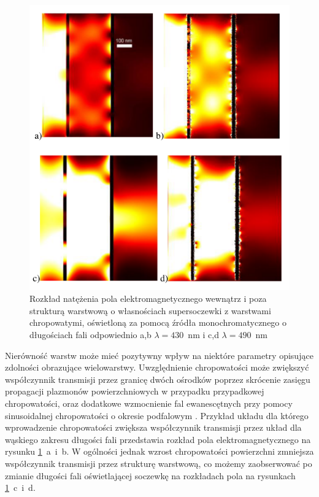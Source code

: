 \begin{figure}[!hbt]
	\begin{center}
	\includegraphics[width=.9\textwidth]{images/multilayer/plp-chropo.png}
	\end{center}
	\caption{Rozkład natężenia pola elektromagnetycznego wewnątrz i poza strukturą warstwową o własnościach supersoczewki z warstwami chropowatymi, oświetloną za pomocą źródła monochromatycznego o długościach fali odpowiednio a,b $\lambda=430$~nm  i  c,d $\lambda=490$~nm~\cite{Stolarek_2013}}
	\label{fig:plp-chropo-fdtd}
\end{figure}


Nierówność warstw może mieć pozytywny wpływ na niektóre parametry opisujące zdolności obrazujące wielowarstwy. Uwzględnienie chropowatości może zwiększyć współczynnik transmisji przez granicę dwóch ośrodków poprzez skrócenie zasięgu propagacji plazmonów powierzchniowych w przypadku przypadkowej chropowatości, oraz dodatkowe wzmocnienie fal ewanescętnych przy pomocy sinusoidalnej chropowatości o okresie podfalowym \cite{huang2012subwavelength}. Przykład układu dla którego wprowadzenie chropowatości zwiększa współczynnik transmisji przez układ dla wąskiego zakresu długości fali przedstawia rozkład pola elektromagnetycznego na rysunku \ref{fig:plp-chropo-fdtd}~a~i~b. W ogólności jednak wzrost chropowatości powierzchni zmniejsza współczynnik transmisji przez strukturę warstwową, co możemy zaobserwować po zmianie długości fali oświetlającej soczewkę na rozkładach pola na rysunkach \ref{fig:plp-chropo-fdtd}~c~i~d. 

